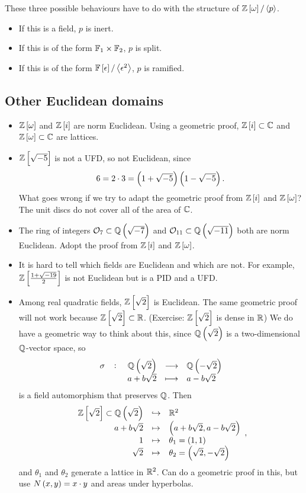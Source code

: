 \begin{remark*}
These three possible behaviours have to do with the structure of $ \Z\sbr{\omega} / \abr{p} $.
\begin{itemize}
\item If this is a field, $ p $ is inert.
\item If this is of the form $ \mathbb{F}_1 \times \mathbb{F}_2 $, $ p $ is split.
\item If this is of the form $ \F\sbr{\epsilon} / \abr{\epsilon^2} $, $ p $ is ramified.
\end{itemize}
\end{remark*}

\subsection{Other Euclidean domains}

\begin{itemize}
\item $ \Z\sbr{\omega} $ and $ \Z\sbr{i} $ are norm Euclidean. Using a geometric proof, $ \Z\sbr{i} \subset \C $ and $ \Z\sbr{\omega} \subset \C $ are lattices.
\item $ \Z\sbr{\sqrt{-5}} $ is not a UFD, so not Euclidean, since
$$ 6 = 2 \cdot 3 = \br{1 + \sqrt{-5}}\br{1 - \sqrt{-5}}. $$
What goes wrong if we try to adapt the geometric proof from $ \Z\sbr{i} $ and $ \Z\sbr{\omega} $? The unit discs do not cover all of the area of $ \mathbb{C} $.
\item The ring of integers $ \OO_7 \subset \Q\br{\sqrt{-7}} $ and $ \OO_{11} \subset \Q\br{\sqrt{-11}} $ both are norm Euclidean. Adopt the proof from $ \Z\sbr{i} $ and $ \Z\sbr{\omega} $.
\item It is hard to tell which fields are Euclidean and which are not. For example, $ \Z\sbr{\tfrac{1 + \sqrt{-19}}{2}} $ is not Euclidean but is a PID and a UFD.
\item Among real quadratic fields, $ \Z\sbr{\sqrt{2}} $ is Euclidean. The same geometric proof will not work because $ \Z\sbr{\sqrt{2}} \subset \R $. (Exercise: $ \Z\sbr{\sqrt{2}} $ is dense in $ \mathbb{R} $) We do have a geometric way to think about this, since $ \Q\br{\sqrt{2}} $ is a two-dimensional $ \mathbb{Q} $-vector space, so
$$ \function[\sigma]{\Q\br{\sqrt{2}}}{\Q\br{-\sqrt{2}}}{a + b\sqrt{2}}{a - b\sqrt{2}} $$
is a field automorphism that preserves $ \mathbb{Q} $. Then
$$
\begin{array}{rcl}
\Z\sbr{\sqrt{2}} \subset \Q\br{\sqrt{2}} & \hookrightarrow & \R^2 \\
a + b\sqrt{2} & \mapsto & \br{a + b\sqrt{2}, a - b\sqrt{2}} \\
1 & \mapsto & \theta_1 = \br{1, 1} \\
\sqrt{2} & \mapsto & \theta_2 = \br{\sqrt{2}, -\sqrt{2}}
\end{array},
$$
and $ \theta_1 $ and $ \theta_2 $ generate a lattice in $ \mathbb{R}^2 $. Can do a geometric proof in this, but use $ N\br{x, y} = x \cdot y $ and areas under hyperbolas.
\end{itemize}


